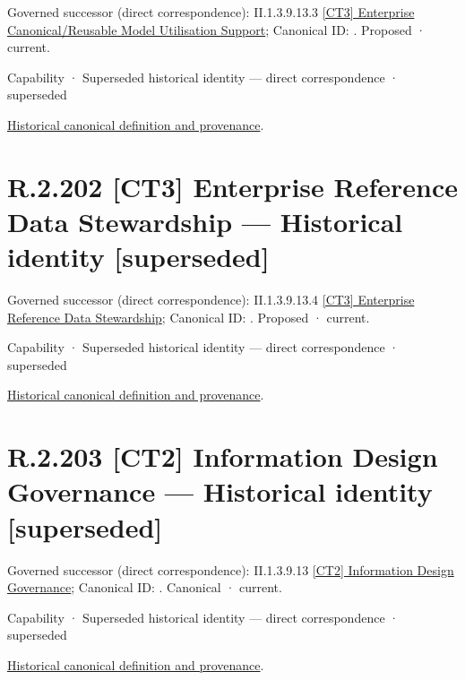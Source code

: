 {\small Governed successor (direct correspondence): II.1.3.9.13.3 \hyperref[element:5744cb9d86494064af87afb3cbf2cf97]{[CT3] Enterprise Canonical/Reusable Model Utilisation Support}; Canonical ID: \texttt{}. Proposed · current.}\par
\label{element:7ae95677a00346f18a0ba01522a20153}
{\small Capability · Superseded historical identity — direct correspondence · superseded}\par
\href{../../../../../../../continuum/strategy/capability/7ae95677a00346f18a0ba01522a20153.md}{Historical canonical definition and provenance}.\par
\section*{R.2.202 [CT3] Enterprise Reference Data Stewardship — Historical identity [superseded]}
\label{navigation:R.2.202}

{\small Governed successor (direct correspondence): II.1.3.9.13.4 \hyperref[element:971d4b079ad24e89b70a8ed8dec0c8bf]{[CT3] Enterprise Reference Data Stewardship}; Canonical ID: \texttt{}. Proposed · current.}\par
\label{element:fd9f3239fdb64ea687825b66bb4d1f17}
{\small Capability · Superseded historical identity — direct correspondence · superseded}\par
\href{../../../../../../../continuum/strategy/capability/fd9f3239fdb64ea687825b66bb4d1f17.md}{Historical canonical definition and provenance}.\par
\section*{R.2.203 [CT2] Information Design Governance — Historical identity [superseded]}
\label{navigation:R.2.203}

{\small Governed successor (direct correspondence): II.1.3.9.13 \hyperref[element:f39ed9ebcc724857a4bf7a2b8e045c7a]{[CT2] Information Design Governance}; Canonical ID: \texttt{}. Canonical · current.}\par
\label{element:0bdd7f8c0cd74d9fabc49801af037fc2}
{\small Capability · Superseded historical identity — direct correspondence · superseded}\par
\href{../../../../../../../continuum/strategy/capability/0bdd7f8c0cd74d9fabc49801af037fc2.md}{Historical canonical definition and provenance}.\par
